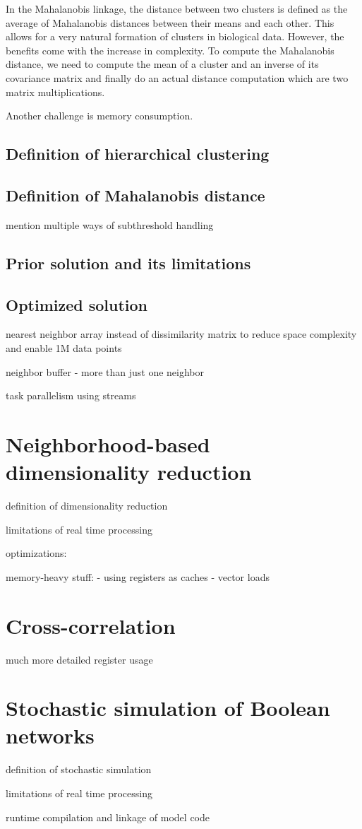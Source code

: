 In the Mahalanobis linkage, the distance between two clusters is defined as the average of Mahalanobis distances between their means and each other.
This allows for a very natural formation of clusters in biological data. However, the benefits come with the increase in complexity. 
To compute the Mahalanobis distance, we need to compute the mean of a cluster and an inverse of its covariance matrix and finally do an actual distance computation which are two matrix multiplications.

Another challenge is memory consumption. 

\subsection{Definition of hierarchical clustering}

\subsection{Definition of Mahalanobis distance}

mention multiple ways of subthreshold handling 

\subsection{Prior solution and its limitations}

\subsection{Optimized solution}

nearest neighbor array instead of dissimilarity matrix to reduce space complexity and enable 1M data points

neighbor buffer - more than just one neighbor

task parallelism using streams



\section{Neighborhood-based dimensionality reduction}

definition of dimensionality reduction

limitations of real time processing


optimizations:

memory-heavy stuff:
- using registers as caches
- vector loads

\section{Cross-correlation}

much more detailed register usage 

\section{Stochastic simulation of Boolean networks}

definition of stochastic simulation

limitations of real time processing

runtime compilation and linkage of model code